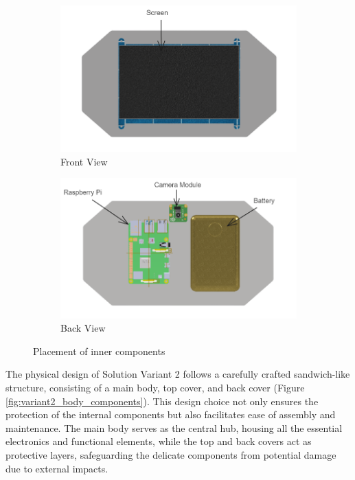 \begin{figure}[h!]
    \centering
    \begin{subfigure}[c]{0.47\textwidth}
        \begin{minipage}{\textwidth}
            \centering
            \includegraphics[height=4 cm]{texs/Part1/chapter4/image/v25.png}
        \end{minipage}
        \caption{Front View}
        \label{fig:variant2_front_view_main}
    \end{subfigure}
    \begin{subfigure}[c]{0.47\textwidth}
        \begin{minipage}{\textwidth}
            \centering
            \includegraphics[height=4 cm]{texs/Part1/chapter4/image/v26.png}
        \end{minipage}
        \caption{Back View}
        \label{fig:variant2_back_view_main}
    \end{subfigure}
    \caption{Placement of inner components}
    \label{fig:variant2_inner_components}
\end{figure}

The physical design of Solution Variant 2 follows a carefully crafted sandwich-like structure, consisting of a main body, top cover, and back cover (Figure \ref{fig:variant2_body_components}). This design choice not only ensures the protection of the internal components but also facilitates ease of assembly and maintenance. The main body serves as the central hub, housing all the essential electronics and functional elements, while the top and back covers act as protective layers, safeguarding the delicate components from potential damage due to external impacts.


